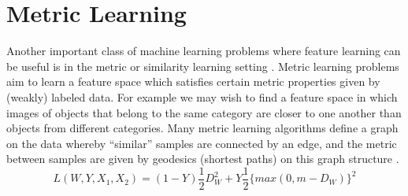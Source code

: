 \section{Metric Learning}
Another important class of machine learning problems where feature learning can
be useful is in the metric or similarity learning setting
\cite{tenenbaum2000,DrLIM}. Metric learning problems aim to learn a feature
space which satisfies certain metric properties given by (weakly) labeled data.
For example we may wish to find a feature space in which images of objects that
belong to the same category are closer to one another than objects from
different categories. Many metric learning algorithms define a graph on the
data whereby ``similar'' samples are connected by an edge, and the metric
between samples are given by geodesics (shortest paths) on this graph structure
\cite{tenenbaum2000, coifman2006}.
\begin{equation} 
L(W,Y,X_1,X_2) = (1-Y)\frac{1}{2}D_W^2 + Y \frac{1}{2}\{max(0,m-D_W)\}^2        
\end{equation}  
 
